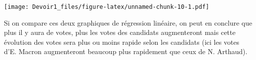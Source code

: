 \documentclass[
]{article}
\newenvironment{Shaded}{\begin{snugshade}}{\end{snugshade}}
\newcommand{\FunctionTok}[1]{\textcolor[rgb]{0.13,0.29,0.53}{\textbf{#1}}}
\newcommand{\NormalTok}[1]{#1}
\newcommand{\SpecialCharTok}[1]{\textcolor[rgb]{0.81,0.36,0.00}{\textbf{#1}}}
\newcommand{\StringTok}[1]{\textcolor[rgb]{0.31,0.60,0.02}{#1}}
\begin{document}
\begin{Shaded}
\end{Shaded}

\texttt{[image: Devoir1\_files/figure-latex/unnamed-chunk-10-1.pdf]}

Si on compare ces deux graphiques de régression linéaire, on peut en
conclure que plus il y aura de votes, plus les votes des candidats
augmenteront mais cette évolution des votes sera plus ou moins rapide
selon les candidats (ici les votes d'E. Macron augmenteront beaucoup
plus rapidement que ceux de N. Arthaud).
\end{document}
